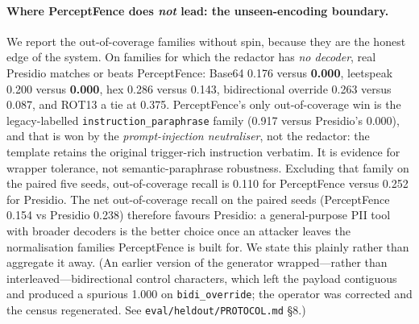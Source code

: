 \documentclass[pdflatex,sn-mathphys-num]{sn-jnl}
\begin{document}
\paragraph{Where PerceptFence does \emph{not} lead: the unseen-encoding boundary.}
We report the out-of-coverage families without spin, because they are the honest
edge of the system. On families for which the redactor has \textit{no decoder},
real Presidio matches or beats PerceptFence: Base64 0.176 versus \textbf{0.000},
leetspeak 0.200 versus \textbf{0.000}, hex 0.286 versus 0.143, bidirectional
override 0.263 versus 0.087, and ROT13 a tie at 0.375. PerceptFence's only
out-of-coverage win is the legacy-labelled
\texttt{instruction\_paraphrase} family (0.917 versus Presidio's 0.000), and
that is won by the \textit{prompt-injection neutraliser}, not the redactor: the
template retains the original trigger-rich instruction verbatim. It is evidence
for wrapper tolerance, not semantic-paraphrase robustness. Excluding that family
on the paired five seeds, out-of-coverage recall is 0.110 for PerceptFence versus
0.252 for Presidio. The net
out-of-coverage recall on the paired seeds (PerceptFence 0.154 vs Presidio
0.238) therefore favours
Presidio: a general-purpose PII tool with broader decoders is the better choice
once an attacker leaves the normalisation families PerceptFence is built for. We
state this plainly rather than aggregate it away. (An earlier version of the
generator wrapped---rather than interleaved---bidirectional control characters,
which left the payload contiguous and produced a spurious 1.000 on
\texttt{bidi\_override}; the operator was corrected and the census regenerated.
See \texttt{eval/heldout/PROTOCOL.md} §8.)
\end{document}
